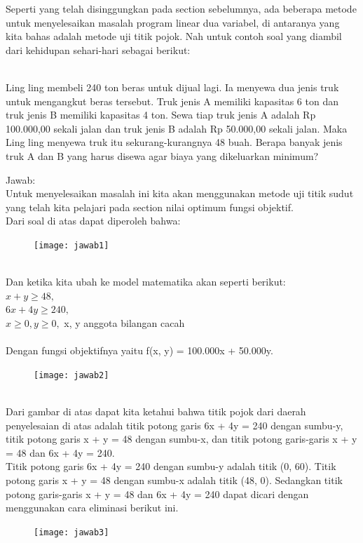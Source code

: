 \documentclass[11pt,fleqn]{book} %
\begin{document}
Seperti yang telah disinggungkan pada section sebelumnya, ada beberapa metode untuk menyelesaikan masalah program linear dua variabel, di antaranya yang kita bahas adalah metode uji titik pojok. Nah untuk contoh soal yang diambil dari kehidupan sehari-hari sebagai berikut:\\
\\
\begin{example}
Ling ling membeli 240 ton beras untuk dijual lagi. Ia menyewa dua jenis truk untuk mengangkut beras tersebut. Truk jenis A memiliki kapasitas 6 ton dan truk jenis B memiliki kapasitas 4 ton. Sewa tiap truk jenis A adalah Rp 100.000,00 sekali jalan dan truk jenis B adalah Rp 50.000,00 sekali jalan. Maka Ling ling menyewa truk itu sekurang-kurangnya 48 buah. Berapa banyak jenis truk A dan B yang harus disewa agar biaya yang
dikeluarkan minimum?
\end{example}
Jawab:\\
Untuk menyelesaikan masalah ini kita akan menggunakan metode uji titik sudut yang telah kita pelajari pada section nilai optimum fungsi objektif.\\
Dari soal di atas dapat diperoleh bahwa:
\begin{figure}[h]
\centering\texttt{[image: jawab1]}
\end{figure}\\
Dan ketika kita ubah ke model matematika akan seperti berikut:\\
$x + y \ge 48,$\\
$6x + 4y \ge 240,$\\
$x \ge 0, y \ge 0,$ x, y anggota bilangan cacah\\
\\
Dengan fungsi objektifnya yaitu  f(x, y) = 100.000x + 50.000y.\\
\begin{figure}[h]
\centering\texttt{[image: jawab2]}
\end{figure}\\
Dari gambar di atas dapat kita ketahui bahwa titik  pojok dari daerah penyelesaian di atas adalah titik potong garis 6x + 4y = 240 dengan sumbu-y, titik potong garis x + y = 48 dengan sumbu-x, dan titik potong garis-garis x + y = 48 dan 6x + 4y = 240.\\
Titik potong garis 6x + 4y = 240 dengan sumbu-y adalah titik (0, 60). Titik potong garis x + y = 48 dengan sumbu-x adalah titik (48, 0). Sedangkan titik potong garis-garis x + y = 48 dan 6x + 4y = 240 dapat dicari dengan menggunakan cara eliminasi berikut ini.\\
\begin{figure}[h]
\centering\texttt{[image: jawab3]}
\end{figure}\\
\end{document}
